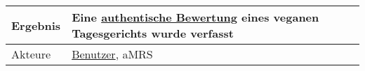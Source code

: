 \begin{table}[H]
\begin{tabularx}{\textwidth}{| l | X |}
        \hline
        Ergebnis           & Eine \hyperref[gls:authentischeBewertung]{authentische Bewertung} eines veganen Tagesgerichts wurde verfasst                                                                                                                                                                                                                                                                                                                                                                                                                                                                                                                                                      \\
        \hline
        Akteure            & \hyperref[gls:nutzer]{Benutzer}, \ac{aMRS}                                                                                                                                                                                                                                                                                                                                                                                                                                                                                                                                                                                                                        \\
        \hline
    \end{tabularx}
\end{table}



